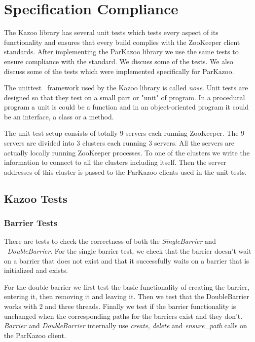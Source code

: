 \chapter{Specification Compliance}

The Kazoo library has several unit tests which tests every aspect of its functionality and ensures that every build complies with the ZooKeeper client standards. After implementing the ParKazoo library we use the same tests to ensure compliance with the standard. We discuss some of the tests. We also discuss some of the tests which were implemented specifically for ParKazoo.

The unittest~\cite{hamill2004unit} framework used by the Kazoo library is called \textit{nose}. Unit tests are designed so that they test on a small part or "unit" of program. In a procedural program a unit is could be a function and in an object-oriented program it could be an interface, a class or a method.

The unit test setup consists of totally 9 servers each running ZooKeeper. The 9 servers are divided into 3 clusters each running 3 servers. All the servers are actually locally running ZooKeeper processes. To one of the clusters we write the information to connect to all the clusters including itself. Then the server addresses of this cluster is passed to the ParKazoo clients used in the unit tests. 

\section{Kazoo Tests}

\subsection{Barrier Tests}
There are tests to check the correctness of both the \textit{SingleBarrier} and ~\textit{DoubleBarrier}. For the single barrier test, we check that the barrier doesn't wait on a barrier that does not exist and that it successfully waits on a barrier that is initialized and exists.

For the double barrier we first test the basic functionality of creating the barrier, entering it, then removing it and leaving it. Then we test that the DoubleBarrier works with 2 and three threads. Finally we test if the barrier functionality is unchanged when the corresponding paths for the barriers exist and they don't. \textit{Barrier} and \textit{DoubleBarrier} internally use \textit{create}, \textit{delete} and \textit{ensure\_path} calls on the ParKazoo client.

